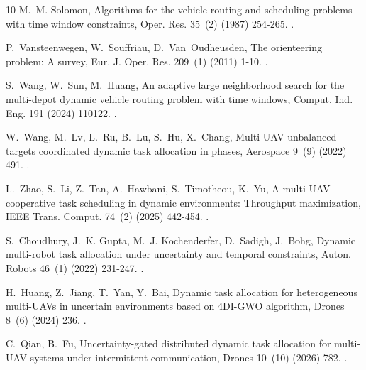 \documentclass[a4paper,fleqn]{cas-dc}
\begin{document}
\begin{thebibliography}{10}
M.~M. Solomon, Algorithms for the vehicle routing and scheduling problems with
  time window constraints, Oper. Res. 35~(2) (1987) 254-265.
\newblock \href {https://doi.org/10.1287/opre.35.2.254}
  {}.

P.~Vansteenwegen, W.~Souffriau, D.~Van~Oudheusden, The orienteering problem: A
  survey, Eur. J. Oper. Res. 209~(1) (2011) 1-10.
\newblock \href {https://doi.org/10.1016/j.ejor.2010.03.045}
  {}.

S.~Wang, W.~Sun, M.~Huang, An adaptive large neighborhood search for the
  multi-depot dynamic vehicle routing problem with time windows, Comput. Ind.
  Eng. 191 (2024) 110122.
\newblock \href {https://doi.org/10.1016/j.cie.2024.110122}
  {}.

W.~Wang, M.~Lv, L.~Ru, B.~Lu, S.~Hu, X.~Chang, Multi-{UAV} unbalanced targets
  coordinated dynamic task allocation in phases, Aerospace 9~(9) (2022) 491.
\newblock \href {https://doi.org/10.3390/aerospace9090491}
  {}.

L.~Zhao, S.~Li, Z.~Tan, A.~Hawbani, S.~Timotheou, K.~Yu, A multi-{UAV}
  cooperative task scheduling in dynamic environments: Throughput maximization,
  IEEE Trans. Comput. 74~(2) (2025) 442-454.
\newblock \href {https://doi.org/10.1109/TC.2024.3483636}
  {}.

S.~Choudhury, J.~K. Gupta, M.~J. Kochenderfer, D.~Sadigh, J.~Bohg, Dynamic
  multi-robot task allocation under uncertainty and temporal constraints,
  Auton. Robots 46~(1) (2022) 231-247.
\newblock \href {https://doi.org/10.1007/s10514-021-10022-9}
  {}.

H.~Huang, Z.~Jiang, T.~Yan, Y.~Bai, Dynamic task allocation for heterogeneous
  multi-{UAVs} in uncertain environments based on {4DI-GWO} algorithm, Drones
  8~(6) (2024) 236.
\newblock \href {https://doi.org/10.3390/drones8060236}
  {}.

C.~Qian, B.~Fu, Uncertainty-gated distributed dynamic task allocation for
  multi-{UAV} systems under intermittent communication, Drones 10~(10) (2026)
  782.
\newblock \href {https://doi.org/10.3390/drones10100782}
  {}.


\end{thebibliography}
\end{document}
